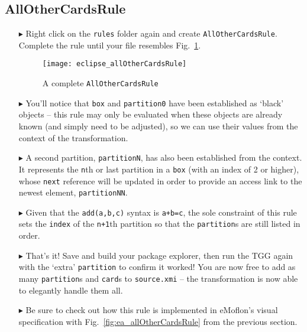 \newpage
\hypertarget{allCards tex}{}
\subsection{AllOtherCardsRule}
\texHeader

\begin{itemize}

\item[$\blacktriangleright$] Right click on the \texttt{rules} folder again and create \texttt{AllOtherCardsRule}. Complete the rule until your file resembles
Fig.~\ref{eclipse:allOtherCardsRule}.

\vspace{0.5cm}

\begin{figure}[htbp]
\begin{center}
  \texttt{[image: eclipse\_allOtherCardsRule]}
  \caption{A complete \texttt{AllOtherCardsRule}}
  \label{eclipse:allOtherCardsRule}
\end{center}
\end{figure}

\item[$\blacktriangleright$] You'll notice that \texttt{box} and \texttt{partition0} have been established as `black' objects -- this rule may only be evaluated
when these objects are already known (and simply need to be adjusted), so we can use their values from the context of the transformation.

\vspace{0.5cm}

\item[$\blacktriangleright$] A second partition, \texttt{partitionN}, has also been established from the context. It represents the \texttt{n}th or last
partition in a \texttt{box} (with an index of 2 or higher), whose \texttt{next} reference will be updated in order to provide an access
link to the newest element, \texttt{partitionNN}.

\newpage

\item[$\blacktriangleright$] Given that the \texttt{add(a,b,c)} syntax is \texttt{a+b=c}, the sole constraint of this rule sets the \texttt{index} of the
\texttt{n+1}th partition so that the \texttt{partition}s are still listed in order.

\vspace{0.5cm}

\item[$\blacktriangleright$] That's it! Save and build your package explorer, then run the TGG again with the `extra' \texttt{partition} to confirm it worked!
You are now free to add as many \texttt{partition}s and \texttt{card}s to \texttt{source.xmi} -- the transformation is now able to elegantly handle them all.

\vspace{0.5cm}

\item[$\blacktriangleright$] Be sure to check out how this rule is implemented in eMoflon's visual specification with Fig.~\ref{fig:ea_allOtherCardsRule} from
the previous section.

\end{itemize}
